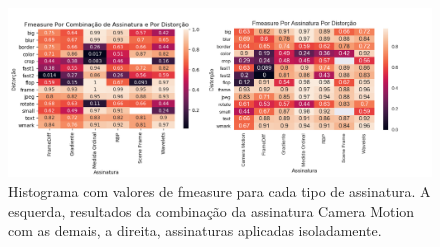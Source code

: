 \begin{figure}
	\caption{Histograma com valores de fmeasure para cada tipo de assinatura. A esquerda, resultados da combinação da assinatura Camera Motion com as demais, a direita, assinaturas aplicadas isoladamente.}
	\label{fig:compacao-metodos}
	\includegraphics[width=\textwidth]{dados/figuras/experimentos/heatmap_final_comparacao.png}
\end{figure}







